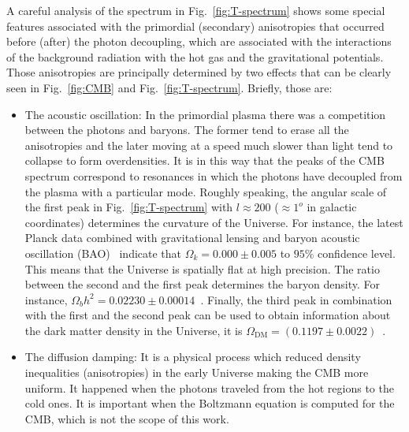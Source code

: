 \begin{itemize}
A careful analysis of the spectrum in Fig.~\ref{fig:T-spectrum} shows some special features associated with the primordial (secondary) anisotropies that occurred before (after) the photon decoupling, which are associated with the interactions of the background radiation with the hot gas and the gravitational potentials. Those anisotropies are principally determined by two effects that can be clearly seen in Fig.~\ref{fig:CMB} and Fig.~\ref{fig:T-spectrum}. Briefly, those are:
%
\begin{itemize}
\item[\textbullet ] The acoustic oscillation: In the primordial plasma there was a competition between the photons and baryons. The former tend to erase all the anisotropies and the later moving at a speed much slower than light tend to collapse to form overdensities. It is in this way that  the peaks of the CMB spectrum correspond to resonances in which the photons have decoupled from the plasma with a particular mode. 
Roughly speaking, the angular scale of the first peak in Fig.~\ref{fig:T-spectrum} with $l\approx 200$ ($\approx 1^o$ in galactic coordinates) determines the curvature of the Universe. For instance, the latest Planck data  combined with gravitational lensing and baryon acoustic oscillation (BAO)~\cite{Ade:2015xua} indicate that $\Omega_k = 0.000 \pm 0.005$ to $95\%$ confidence level. This means that the Universe is spatially flat at high precision.  
The ratio between the second and the first peak determines the baryon density. For instance, $\Omega_bh^2= 0.02230 \pm 0.00014$~\cite{Ade:2015xua}.
Finally, the third peak in combination with the first and the second peak can be used to obtain information about the dark matter density in the Universe, it is $\Omega_{\text{DM}}=(0.1197\pm 0.0022)$~\cite{Ade:2015xua}.

\item[\textbullet ] The diffusion damping: It is a physical process which reduced density inequalities (anisotropies) in the early Universe making the CMB more uniform. It happened when the photons traveled from the hot regions to the cold ones. It is important when the Boltzmann equation is computed for the CMB, which is not the scope of this work. 

\end{itemize}













\end{itemize}

